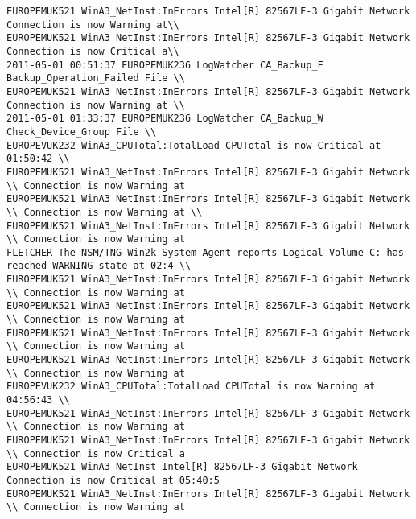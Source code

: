 \begin{lstlisting}
EUROPEMUK521 WinA3_NetInst:InErrors Intel[R] 82567LF-3 Gigabit Network Connection is now Warning at\\
EUROPEMUK521 WinA3_NetInst:InErrors Intel[R] 82567LF-3 Gigabit Network Connection is now Critical a\\
2011-05-01 00:51:37 EUROPEMUK236 LogWatcher CA_Backup_F Backup_Operation_Failed File \\
EUROPEMUK521 WinA3_NetInst:InErrors Intel[R] 82567LF-3 Gigabit Network Connection is now Warning at \\
2011-05-01 01:33:37 EUROPEMUK236 LogWatcher CA_Backup_W Check_Device_Group File \\
EUROPEVUK232 WinA3_CPUTotal:TotalLoad CPUTotal is now Critical at 01:50:42 \\
EUROPEMUK521 WinA3_NetInst:InErrors Intel[R] 82567LF-3 Gigabit Network \\ Connection is now Warning at 
EUROPEMUK521 WinA3_NetInst:InErrors Intel[R] 82567LF-3 Gigabit Network \\ Connection is now Warning at \\
EUROPEMUK521 WinA3_NetInst:InErrors Intel[R] 82567LF-3 Gigabit Network \\ Connection is now Warning at 
FLETCHER The NSM/TNG Win2k System Agent reports Logical Volume C: has reached WARNING state at 02:4 \\
EUROPEMUK521 WinA3_NetInst:InErrors Intel[R] 82567LF-3 Gigabit Network \\ Connection is now Warning at
EUROPEMUK521 WinA3_NetInst:InErrors Intel[R] 82567LF-3 Gigabit Network \\ Connection is now Warning at
EUROPEMUK521 WinA3_NetInst:InErrors Intel[R] 82567LF-3 Gigabit Network \\ Connection is now Warning at
EUROPEMUK521 WinA3_NetInst:InErrors Intel[R] 82567LF-3 Gigabit Network \\ Connection is now Warning at
EUROPEVUK232 WinA3_CPUTotal:TotalLoad CPUTotal is now Warning at 04:56:43 \\ 
EUROPEMUK521 WinA3_NetInst:InErrors Intel[R] 82567LF-3 Gigabit Network \\ Connection is now Warning at
EUROPEMUK521 WinA3_NetInst:InErrors Intel[R] 82567LF-3 Gigabit Network \\ Connection is now Critical a
EUROPEMUK521 WinA3_NetInst Intel[R] 82567LF-3 Gigabit Network Connection is now Critical at 05:40:5 
EUROPEMUK521 WinA3_NetInst:InErrors Intel[R] 82567LF-3 Gigabit Network \\ Connection is now Warning at

\end{lstlisting}
